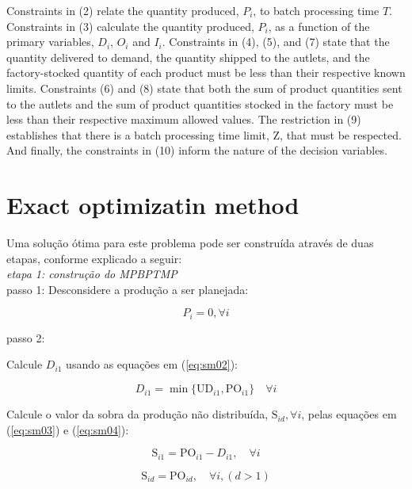 \documentclass[authoryear,preprint,12pt]{elsarticle}
\begin{document}
Constraints in (2) relate the quantity produced, $P_i$, to batch processing time $T$. Constraints in (3) calculate the quantity produced, $P_i$, as a function of the primary variables, $D_i$, $O_i$ and $I_i$. Constraints in (4), (5), and (7) state that the quantity delivered to demand, the quantity shipped to the autlets, and the factory-stocked quantity of each product must be less than their respective known limits. Constraints (6) and (8) state that both the sum of product quantities sent to the autlets and the sum of product quantities stocked in the factory must be less than their respective maximum allowed values. The restriction in (9) establishes that there is a batch processing time limit, $\textrm{Z}$, that must be respected. And finally, the constraints in (10) inform the nature of the decision variables.


\section{Exact optimizatin method}
\label{sec:method}

Uma solução ótima para este problema pode ser construída através de duas etapas, conforme explicado a seguir: \\

\emph{etapa 1: construção do MPBPTMP} \\

passo 1: Desconsidere a produção a ser planejada:

\begin{equation}
\label{eq:sm01}
P_i = 0, \forall i
\end{equation}

passo 2: 

Calcule $D_{i1}$ usando as equações em (\ref{eq:sm02}):

\begin{equation}
\label{eq:sm02}
D_{i1} = \min \{\textrm{UD}_{i1}, \textrm{PO}_{i1}\} \quad \forall i
\end{equation}

Calcule o valor da sobra da produção não distribuída, $\textrm{S}_{id}, \forall i$, pelas equações em (\ref{eq:sm03}) e (\ref{eq:sm04}):

\begin{equation}
\label{eq:sm03}
\textrm{S}_{i1} = \textrm{PO}_{i1} - D_{i1}, \quad \forall i
\end{equation}

\begin{equation}
\label{eq:sm04}
\textrm{S}_{id} = \textrm{PO}_{id}, \quad \forall i, (d>1)
\end{equation}
\end{document}
